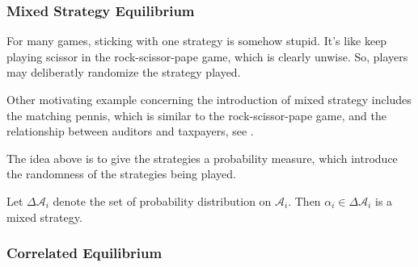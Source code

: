 \subsubsection{Mixed Strategy Equilibrium}
For many games, sticking with one strategy is somehow stupid. It's like keep playing scissor in the rock-scissor-pape game, which is clearly unwise. So, players may deliberatly randomize the strategy played.

Other motivating example concerning the introduction of mixed strategy includes the matching pennis, which is similar to the rock-scissor-pape game, and the relationship between auditors and taxpayers, see \citet[p. 37]{Osborne1994-kg}.

The idea above is to give the strategies a probability measure, which introduce the randomness of the strategies being played.
\begin{definition}
    Let $\Delta \mathcal{A}_i$ denote the set of probability distribution on $\mathcal{A}_i$. Then $\alpha_i \in \Delta \mathcal{A}_i$ is a mixed strategy.
\end{definition}


\subsubsection{Correlated Equilibrium}